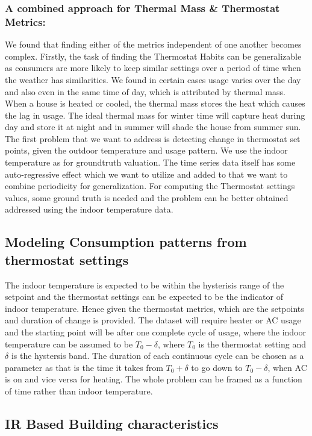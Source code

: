 \documentclass{sig-alternate}
\begin{document}
\subsubsection{\textbf{A combined approach for Thermal Mass \& Thermostat Metrics:}}

\indent We found that finding either of the metrics independent of one another becomes complex. Firstly, the task of finding the Thermostat Habits can be generalizable as consumers are more likely to keep similar settings over a period of time when the weather has similarities. We found in certain cases usage varies over the day and also even in the same time of day, which is attributed by thermal mass. When a house is heated or cooled, the thermal mass stores the heat which causes the lag in usage. The ideal thermal mass for winter time will capture heat during day and store it at night and in summer will shade the house from summer sun. The first problem that we want to address is detecting change in thermostat set points, given the outdoor temperature and usage pattern. We use the indoor temperature as for groundtruth valuation. The time series data itself has some auto-regressive effect which we want to utilize and added to that we want to combine periodicity for generalization.  For computing the Thermostat settings values, some ground truth is needed and the problem can be better obtained addressed using the indoor temperature data.


\subsection{Modeling Consumption patterns from thermostat settings}

\indent The indoor temperature is expected to be within the hysterisis range of the setpoint and the thermostat settings can be expected to be the indicator of indoor temperature. Hence given the thermostat metrics, which are the setpoints and duration of change is provided. The dataset will require heater or AC usage and the starting point will be after one complete cycle of usage, where the indoor temperature can be assumed to be $T_0-\delta$, where $T_0$ is the thermostat setting and $\delta$ is the hystersis band. The duration of each continuous cycle can be chosen as a parameter as that is the time it takes from $T_0 + \delta$ to go down to $T_0 - \delta$, when AC is on and vice versa for heating. The whole problem can be framed as a function of time rather than indoor temperature. 


\subsection{IR Based Building characteristics}
\end{document}
